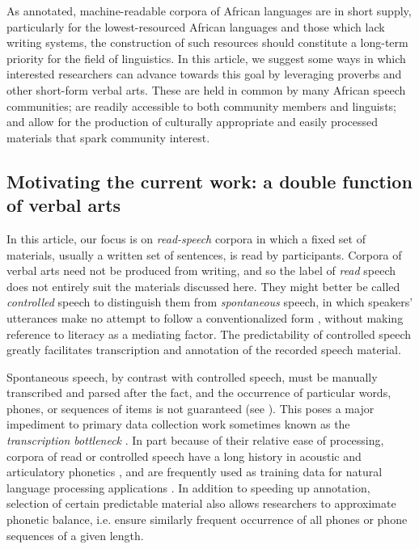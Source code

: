 \documentclass[output=paper,colorlinks,citecolor=brown
]{langscibook}
\begin{document}
As annotated, machine-readable corpora of African languages are in short supply, particularly for the lowest-resourced African languages and those which lack writing systems, the construction of such resources should constitute a long-term priority for the field of linguistics. 
In this article, we suggest some ways in which interested researchers can advance towards this goal by leveraging proverbs and other short-form verbal arts. 
These are held in common by many African speech communities; are readily accessible to both community members and linguists; 
and allow for the production of culturally appropriate and easily processed materials that spark community interest. 

\subsection{Motivating the current work: a double function of verbal arts}

In this article, our focus is on \textit{read-speech} corpora in which a fixed set of materials, usually a written set of sentences, is read by participants. 
Corpora of verbal arts need not be produced from writing, and so the label of \textit{read} speech does not entirely suit the materials discussed here. 
They might better be called \textit{controlled} speech to distinguish them from \textit{spontaneous} speech, in which speakers' utterances make no attempt to follow a conventionalized form \citep{simpson}, without making reference to literacy as a mediating factor. 
The predictability of controlled speech greatly facilitates transcription and annotation of the recorded speech material.

Spontaneous speech, by contrast with controlled speech, must be manually transcribed and parsed after the fact, and the occurrence of particular words, phones, or sequences of items is not guaranteed (see \citealt{xu2010defense}).
This poses a major impediment to primary data collection work sometimes known as the \textit{transcription bottleneck} \citep{seifart2018language}. 
In part because of their relative ease of processing, corpora of read or controlled speech have a long history in acoustic and articulatory phonetics \citep{zue1990speech, garofolo1993darpa, wrench1999mocha}, and are frequently used as training data for natural language processing applications \citep[e.g.][]{black2019cmu, bamba2021, van-niekerk-etal-2017}. 
In addition to speeding up annotation, selection of certain predictable material also allows researchers to approximate phonetic balance, i.e. ensure similarly frequent occurrence of all phones or phone sequences of a given length. 
\end{document}
